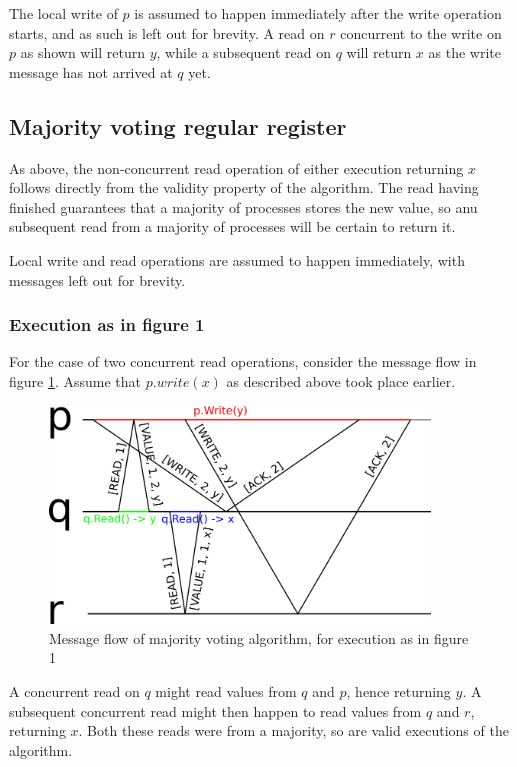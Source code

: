 \documentclass[a4paper]{scrreprt}
\begin{document}
The local write of $p$ is assumed to happen immediately after the write
operation starts, and as such is left out for brevity. A read on $r$ concurrent
to the write on $p$ as shown will return $y$, while a subsequent read on $q$
will return $x$ as the write message has not arrived at $q$ yet.

\subsection{Majority voting regular register}

As above, the non-concurrent read operation of either execution returning $x$
follows directly from the validity property of the algorithm. The read having
finished guarantees that a majority of processes stores the new value, so anu
subsequent read from a majority of processes will be certain to return it.

Local write and read operations are assumed to happen immediately, with
messages left out for brevity.

\subsubsection{Execution as in figure 1}

For the case of two concurrent read operations, consider the message flow in
figure \ref{fig:majority_voting}. Assume that $p.write(x)$ as described above
took place earlier.

\begin{figure}[h]
    \centering
    \includegraphics[width=0.9\textwidth]{res/5_1_b.png}
    \caption{Message flow of majority voting algorithm, for execution as in figure 1}
    \label{fig:majority_voting}
\end{figure}

A concurrent read on $q$ might read values from $q$ and $p$, hence returning
$y$. A subsequent concurrent read might then happen to read values from $q$ and
$r$, returning $x$. Both these reads were from a majority, so are valid
executions of the algorithm.
\end{document}

